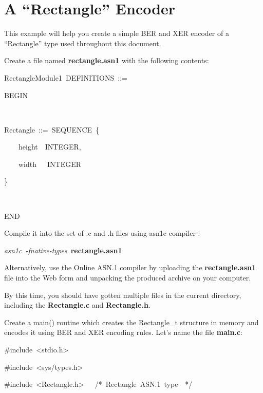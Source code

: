 \documentclass[english,oneside,12pt]{book}
\newenvironment{lyxcode}
{\par\begin{list}{}{
\setlength{\rightmargin}{\leftmargin}
\setlength{\listparindent}{0pt}%
\raggedright
\setlength{\itemsep}{0pt}
\setlength{\parsep}{0pt}
\normalfont\ttfamily}%
 \item[]}
{\end{list}}
\begin{document}
\section{A ``Rectangle'' Encoder}

This example will help you create a simple BER and XER encoder of
a ``Rectangle'' type used throughout this document.
\begin{enumerate}
\item Create a file named \textbf{rectangle.asn1} with the following contents:

\begin{lyxcode}
RectangleModule1~DEFINITIONS~::=

BEGIN

~

Rectangle~::=~SEQUENCE~\{

~~~~height~~INTEGER,

~~~~width~~~INTEGER

\}

~

END
\end{lyxcode}
\item Compile it into the set of .c and .h files using asn1c compiler \cite{ASN1C}:

\begin{lyxcode}
\emph{asn1c~-fnative-types}~\textbf{rectangle.asn1}
\end{lyxcode}
\item Alternatively, use the Online ASN.1 compiler \cite{AONL} by uploading
the \textbf{rectangle.asn1} file into the Web form and unpacking the
produced archive on your computer.
\item By this time, you should have gotten multiple files in the current
directory, including the \textbf{Rectangle.c} and \textbf{Rectangle.h}.
\item Create a main() routine which creates the Rectangle\_t structure in
memory and encodes it using BER and XER encoding rules. Let's name
the file \textbf{main.c}:\clearpage{}

\begin{lyxcode}
{\small \#include~<stdio.h>}{\small \par}

{\small \#include~<sys/types.h>}{\small \par}

{\small \#include~<Rectangle.h>~~~/{*}~Rectangle~ASN.1~type~~{*}/}{\small \par}

~


\end{lyxcode}
\end{enumerate}
\end{document}
